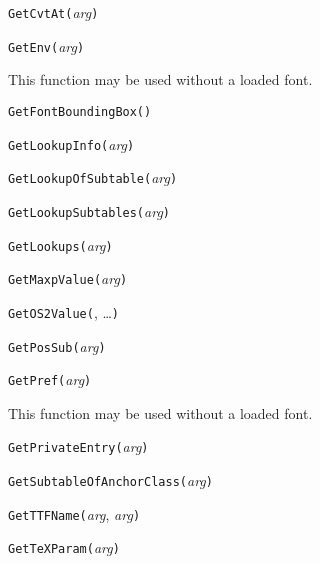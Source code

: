 
\noindent\texttt{GetCvtAt(}\textit{arg}\texttt{)}


\noindent\texttt{GetEnv(}\textit{arg}\texttt{)}

This function may be used without a loaded font.


\noindent\texttt{GetFontBoundingBox(}\texttt{)}


\noindent\texttt{GetLookupInfo(}\textit{arg}\texttt{)}


\noindent\texttt{GetLookupOfSubtable(}\textit{arg}\texttt{)}


\noindent\texttt{GetLookupSubtables(}\textit{arg}\texttt{)}


\noindent\texttt{GetLookups(}\textit{arg}\texttt{)}


\noindent\texttt{GetMaxpValue(}\textit{arg}\texttt{)}


\noindent\texttt{GetOS2Value(}, \ldots\texttt{)}


\noindent\texttt{GetPosSub(}\textit{arg}\texttt{)}


\noindent\texttt{GetPref(}\textit{arg}\texttt{)}

This function may be used without a loaded font.


\noindent\texttt{GetPrivateEntry(}\textit{arg}\texttt{)}


\noindent\texttt{GetSubtableOfAnchorClass(}\textit{arg}\texttt{)}


\noindent\texttt{GetTTFName(}\textit{arg}, \textit{arg}\texttt{)}


\noindent\texttt{GetTeXParam(}\textit{arg}\texttt{)}

